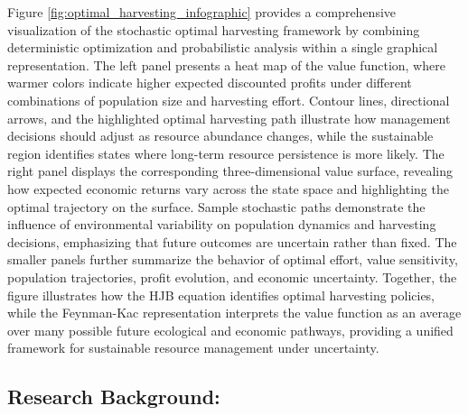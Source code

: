\documentclass[11pt]{article}
\begin{document}
	Figure \ref{fig:optimal_harvesting_infographic} provides a comprehensive visualization of the stochastic optimal harvesting framework by combining deterministic optimization and probabilistic analysis within a single graphical representation. The left panel presents a heat map of the value function, where warmer colors indicate higher expected discounted profits under different combinations of population size and harvesting effort. Contour lines, directional arrows, and the highlighted optimal harvesting path illustrate how management decisions should adjust as resource abundance changes, while the sustainable region identifies states where long-term resource persistence is more likely. The right panel displays the corresponding three-dimensional value surface, revealing how expected economic returns vary across the state space and highlighting the optimal trajectory on the surface. Sample stochastic paths demonstrate the influence of environmental variability on population dynamics and harvesting decisions, emphasizing that future outcomes are uncertain rather than fixed. The smaller panels further summarize the behavior of optimal effort, value sensitivity, population trajectories, profit evolution, and economic uncertainty. Together, the figure illustrates how the HJB equation identifies optimal harvesting policies, while the Feynman-Kac representation interprets the value function as an average over many possible future ecological and economic pathways, providing a unified framework for sustainable resource management under uncertainty.
	
	
	\subsection{Research Background:}
	
\end{document}
